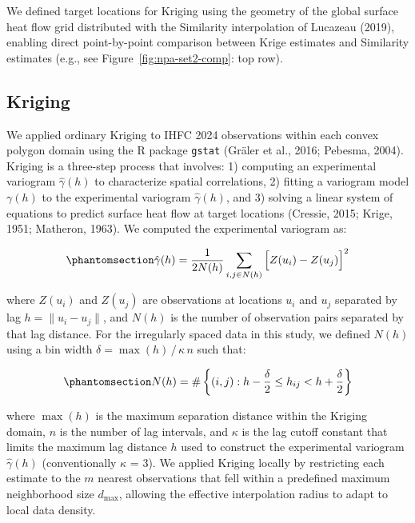 \documentclass[draft,linenumbers]{agujournal2019}
\begin{document}
We defined target locations for Kriging using the geometry of the global
surface heat flow grid distributed with the Similarity interpolation of
Lucazeau (2019), enabling direct point-by-point comparison between Krige
estimates and Similarity estimates (e.g., see
Figure~\ref{fig:npa-set2-comp}: top row).

\subsection{Kriging}\label{sec:kriging}

We applied ordinary Kriging to IHFC 2024 observations within each convex
polygon domain using the R package \texttt{gstat} (Gräler et al., 2016;
Pebesma, 2004). Kriging is a three-step process that involves: 1)
computing an experimental variogram \(\hat{\gamma}(h)\) to characterize
spatial correlations, 2) fitting a variogram model \(\gamma(h)\) to the
experimental variogram \(\hat{\gamma}(h)\), and 3) solving a linear
system of equations to predict surface heat flow at target locations
(Cressie, 2015; Krige, 1951; Matheron, 1963). We computed the
experimental variogram as:

\begin{equation}\protect\phantomsection\label{eq:variogram}{
  \hat{\gamma}(h) = \frac{1}{2N(h)} \sum_{i,j \in N(h)} \Big[Z(u_i) - Z(u_j)\Big]^2
}\end{equation}

where \(Z(u_i)\) and \(Z(u_j)\) are observations at locations \(u_i\)
and \(u_j\) separated by lag \(h = \lVert u_i - u_j \rVert\), and
\(N(h)\) is the number of observation pairs separated by that lag
distance. For the irregularly spaced data in this study, we defined
\(N(h)\) using a bin width \(\delta = \max(h)\, /\, \kappa\, n\) such
that:

\begin{equation}\protect\phantomsection\label{eq:pairs}{
  N(h) = \# \left\{(i,j) : h - \frac{\delta}{2} \le h_{ij} < h + \frac{\delta}{2} \right\}
}\end{equation}

where \(\max(h)\) is the maximum separation distance within the Kriging
domain, \(n\) is the number of lag intervals, and \(\kappa\) is the lag
cutoff constant that limits the maximum lag distance \(h\) used to
construct the experimental variogram \(\hat{\gamma}(h)\) (conventionally
\(\kappa\) = 3). We applied Kriging locally by restricting each estimate
to the \(m\) nearest observations that fell within a predefined maximum
neighborhood size \(d_\mathrm{max}\), allowing the effective
interpolation radius to adapt to local data density.
\end{document}
